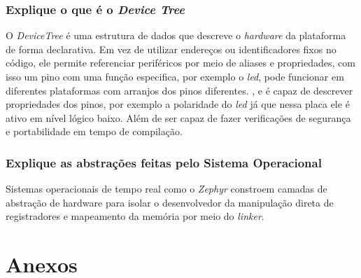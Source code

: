 \documentclass{article}
\begin{document}
\section{Explique o que é o \textit{Device Tree}}
    O \textit{DeviceTree} é uma estrutura de dados que descreve o \textit{hardware} da plataforma de forma declarativa. Em vez de utilizar endereços ou identificadores fixos no código, ele permite referenciar periféricos por meio de aliases e propriedades, com isso um pino com uma função especifica, por exemplo o \textit{led}, pode funcionar em diferentes plataformas com arranjos dos pinos diferentes. , e é capaz de descrever propriedades dos pinos, por exemplo a polaridade do \textit{led} já que nessa placa ele é ativo em nível lógico baixo. Além de ser capaz de fazer verificações de segurança e portabilidade em tempo de compilação.

\section{Explique as abstrações feitas pelo Sistema Operacional}
    Sistemas operacionais de tempo real como o \textit{Zephyr} constroem camadas de abstração de hardware para isolar o desenvolvedor da manipulação direta de registradores e mapeamento da memória por meio do \textit{linker}.

\appendix
\renewcommand{\thesection}{\arabic{section}}
    
\newpage
\part*{\centering Anexos}
\end{document}
